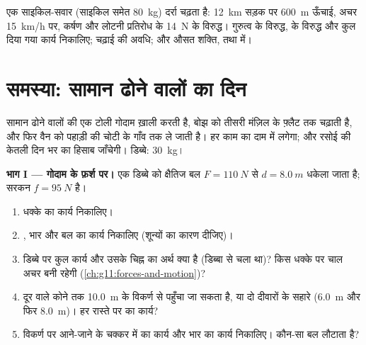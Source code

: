 \begin{exercise}[$\star\star\star$]\label{exo:g11:work-of-force:15}
एक साइकिल-सवार (साइकिल समेत \qty{80}{kg}) दर्रा चढ़ता है: \qty{12}{km} सड़क पर \qty{600}{m}
ऊँचाई, अचर \qty{15}{km/h} पर, कर्षण और लोटनी प्रतिरोध के \qty{14}{N} के
विरुद्ध। गुरुत्व के विरुद्ध,  के विरुद्ध और कुल दिया गया
कार्य निकालिए; चढ़ाई की अवधि; और औसत शक्ति, 
तथा  में।
\end{exercise}

\section{समस्या: सामान ढोने वालों का दिन}

\begin{problem}
\label{pb:g11:work-of-force:1}
सामान ढोने वालों की एक टोली गोदाम ख़ाली करती है, बोझ को तीसरी मंज़िल के फ़्लैट
तक चढ़ाती है, और फिर वैन को पहाड़ी की चोटी के गाँव तक ले जाती है। हर काम का
दाम  में लगेगा; और रसोई की केतली दिन भर का हिसाब जाँचेगी।
डिब्बे: \qty{30}{kg}।

\medskip
\noindent\textbf{भाग I --- गोदाम के फ़र्श पर।}
एक डिब्बे को क्षैतिज बल $F = \qty{110}{N}$ से $d = \qty{8.0}{m}$ धकेला जाता है; सरकन
 $f = \qty{95}{N}$ है।
\begin{enumerate}
  \item धक्के का कार्य निकालिए।
  \item {}, भार और  बल का कार्य
        निकालिए (शून्यों का कारण दीजिए)।
  \item डिब्बे पर कुल कार्य और उसके चिह्न का अर्थ क्या है (डिब्बा
         से चला था)? किस धक्के पर चाल अचर बनी रहेगी (\cref{ch:g11:forces-and-motion})?
  \item दूर वाले कोने तक \qty{10.0}{m} के विकर्ण से पहुँचा जा सकता है, या दो
        दीवारों के सहारे (\qty{6.0}{m} और फिर \qty{8.0}{m})। हर रास्ते पर
         का कार्य?
  \item विकर्ण पर आने-जाने के चक्कर में  का कार्य और
        भार का कार्य निकालिए। कौन-सा बल लौटाता है?
\end{enumerate}


\end{problem}
